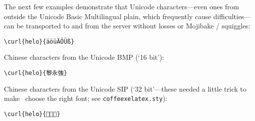The next few examples demonstrate that Unicode characters---even ones from outside the Unicode Basic
Multilingual plain, which frequently cause difficulties---can be transported to and from the server
without losses or Mojibake / squiggles:

\begin{verbatim}
\curl{helo}{äöüÄÖÜß}
\end{verbatim}


Chinese characters from the Unicode BMP (`16 bit'):

\begin{verbatim}
\curl{helo}{黎永強}
\end{verbatim}


Chinese characters from the Unicode SIP (`32 bit'---these needed a little trick to make \XeLaTeX\ choose
the right font; see \verb#coffeexelatex.sty#):

\begin{verbatim}
\curl{helo}{𠀀𠀐𠀙}
\end{verbatim}






